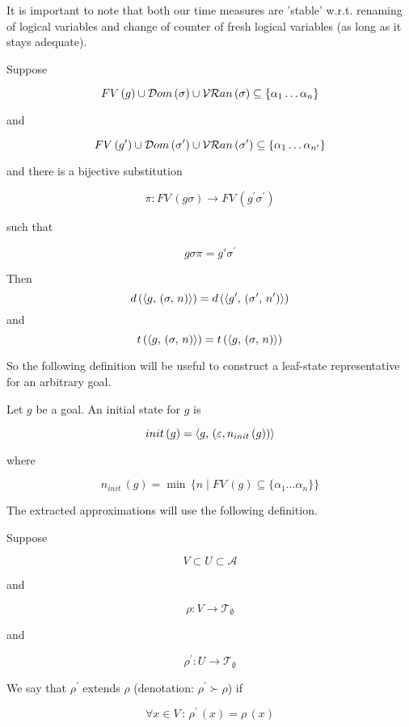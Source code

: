              
It is important to note that both our time measures are 'stable' w.r.t. renaming of logical variables and change of counter of fresh logical variables (as long as it stays adequate).

\begin{lemma}

  Suppose

  \[ FV\,(g) \cup \mathcal{D}om\,(\sigma) \cup \mathcal{VR}an\,(\sigma) \subseteq \{ \alpha_1\dots\alpha_n \} \]
  
  and

  \[ FV\,(g^\prime) \cup \mathcal{D}om\,(\sigma^\prime) \cup \mathcal{VR}an\,(\sigma^\prime) \subseteq \{ \alpha_1\dots \alpha_{n^\prime} \} \]

  and there is a bijective substitution

  \[\pi \colon FV\,(g \sigma) \to FV\,(g^\prime \sigma^\prime)\]

  such that

  \[g \sigma \pi = g' \sigma^\prime\]

Then \[ d\,(\langle g ,\, (\sigma ,\, n) \rangle) = d\,(\langle g^\prime ,\, (\sigma^\prime ,\, n^\prime) \rangle) \] and \[ t\,(\langle g ,\, (\sigma ,\, n) \rangle) = t\,(\langle g ,\, (\sigma ,\, n) \rangle) \] 

\end{lemma}

So the following definition will be useful to construct a leaf-state representative for an arbitrary goal.

\begin{definition} Let $g$ be a goal. An initial state for $g$ is

  \[
   init\,(g)=\langle g ,\, (\varepsilon, n_{init}\,(g)) \rangle
  \]

  where
  
  \[ n_{init}\,(g) = \min\, \{ n \mid FV\,(g) \subseteq \{ \alpha_1\dots\alpha_n \} \} \]
\end{definition}
		
The extracted approximations will use the following definition.

\begin{definition}
  Suppose

  \[V \subset U \subset \mathcal{A}\]

  and

  \[\rho \colon V \to \mathcal{T}_{\emptyset}\]

  and

  \[\rho^\prime \colon U \to \mathcal{T}_{\emptyset}\]

  We say that $\rho^\prime$ extends $\rho$ (denotation: $ \rho^\prime \succ \rho$) if
  
\[ \forall x \in V \,:\, \rho^\prime\,(x) = \rho\,(x) \]
\end{definition}

